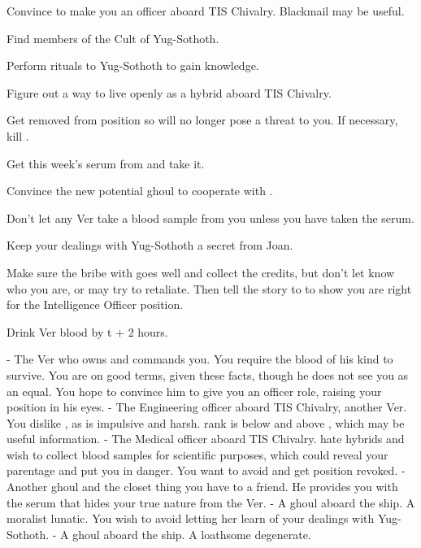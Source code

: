 \documentclass[char]{guildcamp4}
\begin{document}
\begin{itemz}[Goals]
	\item Convince \cVone{} to make you an officer aboard TIS Chivalry. Blackmail may be useful.
	\item Find members of the Cult of Yug-Sothoth. 
	\item Perform rituals to Yug-Sothoth to gain knowledge.
	\item Figure out a way to live openly as a hybrid aboard TIS Chivalry.
	\item Get \cVthree{} removed from \cVthree{\their} position so \cVthree{\they} will no longer pose a threat to you. If necessary, kill \cVthree{\them}.
	\item Get this week's serum from \cJames{} and take it.
	\item Convince the new potential ghoul to cooperate with \cVone{}.
	\item Don't let any Ver take a blood sample from you unless you have taken the serum.
	\item Keep your dealings with Yug-Sothoth a secret from Joan.
	\item Make sure the bribe with \cCbad{} goes well and collect the credits, but don't let \cCbad{\them} know who you are, or \cCbad{\they} may try to retaliate. Then tell the story to \cVone{} to show you are right for the Intelligence Officer position.
	\item Drink Ver blood by t + 2 hours.
\end{itemz}

\begin{itemz}[Notes]
	\item 
\end{itemz}

\begin{contacts}
	\contact{\cVone{}} - The Ver who owns and commands you. You require the blood of his kind to survive. You are on good terms, given these facts, though he does not see you as an equal. You hope to convince him to give you an officer role, raising your position in his eyes.
	\contact{\cVtwo{}} - The Engineering officer aboard TIS Chivalry, another Ver. You dislike \cVtwo{\them}, as \cVtwo{\they} is impulsive and harsh. \cVtwo{\their} rank is below \cVone{} and above \cVthree{}, which may be useful information.
	\contact{\cVthree{}} - The Medical officer aboard TIS Chivalry. \cVthree{\They} hate hybrids and wish to collect blood samples for scientific purposes, which could reveal your parentage and put you in danger. You want to avoid \cVthree{\them} and get \cVthree{\their} position revoked.
	\contact{\cJames{}} - Another ghoul and the closet thing you have to a friend. He provides you with the serum that hides your true nature from the Ver. 
	\contact{\cJoan{}} - A ghoul aboard the ship. A moralist lunatic. You wish to avoid letting her learn of your dealings with Yug-Sothoth.  
	\contact{\cJulie{}} - A ghoul aboard the ship. A loathsome degenerate. 
\end{contacts}

\end{document}
